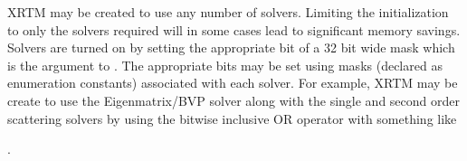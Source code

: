 %
\label{xrtm_c_interface_configuration_constants_solvers}
XRTM may be created to use any number of solvers.  Limiting the initialization to only the solvers required will in some cases lead to significant memory savings.  Solvers are turned on by setting the appropriate bit of a 32 bit wide mask which is the  argument to .  The appropriate bits may be set using masks (declared as enumeration constants) associated with each solver.  For example, XRTM may be create to use the Eigenmatrix/BVP solver along with the single and second order scattering solvers by using the bitwise inclusive OR operator with something like
\begin{list}{}{}
\item {}.
\end{list}

